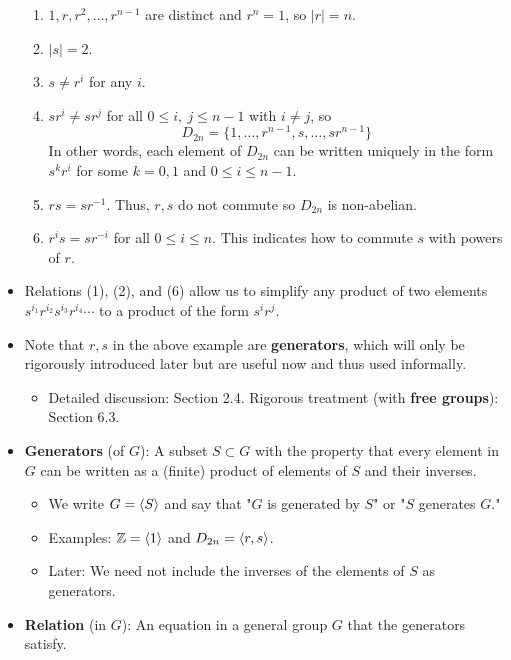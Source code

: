 \documentclass[../notes.tex]{subfiles}
\begin{document}
\begin{itemize}
    \begin{enumerate}
        \item $1,r,r^2,\dots,r^{n-1}$ are distinct and $r^n=1$, so $|r|=n$.
        \item $|s|=2$.
        \item $s\neq r^i$ for any $i$.
        \item $sr^i\neq sr^j$ for all $0\leq i,\ j\leq n-1$ with $i\neq j$, so
        \begin{equation*}
            D_{2n} = \{1,\dots,r^{n-1},s,\dots,sr^{n-1}\}
        \end{equation*}
        In other words, each element of $D_{2n}$ can be written uniquely in the form $s^kr^i$ for some $k=0,1$ and $0\leq i\leq n-1$.
        \item $rs=sr^{-1}$. Thus, $r,s$ do not commute so $D_{2n}$ is non-abelian.
        \item $r^is=sr^{-i}$ for all $0\leq i\leq n$. This indicates how to commute $s$ with powers of $r$.
    \end{enumerate}
    \item Relations (1), (2), and (6) allow us to simplify any product of two elements $s^{i_1}r^{i_2}s^{i_3}r^{i_4}\cdots$ to a product of the form $s^ir^j$.
    \item Note that $r,s$ in the above example are \textbf{generators}, which will only be rigorously introduced later but are useful now and thus used informally.
    \begin{itemize}
        \item Detailed discussion: Section 2.4. Rigorous treatment (with \textbf{free groups}): Section 6.3.
    \end{itemize}
    \item \textbf{Generators} (of $G$): A subset $S\subset G$ with the property that every element in $G$ can be written as a (finite) product of elements of $S$ and their inverses.
    \begin{itemize}
        \item We write $G=\left\langle{S}\right\rangle$ and say that "$G$ is generated by $S$" or "$S$ generates $G$."
        \item Examples: $\mathbb{Z}=\left\langle{1}\right\rangle$ and $D_{2n}=\left\langle{r,s}\right\rangle$.
        \item Later: We need not include the inverses of the elements of $S$ as generators.
    \end{itemize}
    \item \textbf{Relation} (in $G$): An equation in a general group $G$ that the generators satisfy.

\end{itemize}
\end{document}
